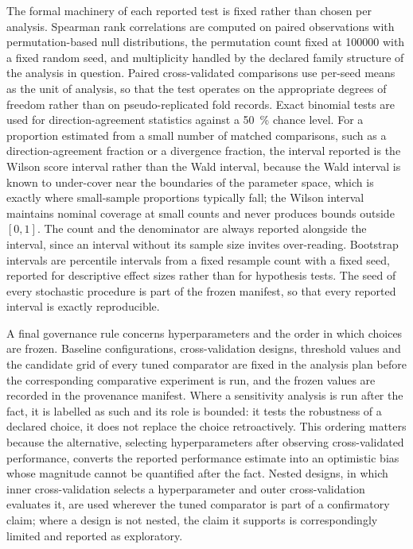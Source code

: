 The formal machinery of each reported test is fixed rather than chosen per analysis. Spearman rank correlations are computed on paired observations with permutation-based null distributions, the permutation count fixed at \num{100000} with a fixed random seed, and multiplicity handled by the declared family structure of the analysis in question. Paired cross-validated comparisons use per-seed means as the unit of analysis, so that the test operates on the appropriate degrees of freedom rather than on pseudo-replicated fold records. Exact binomial tests are used for direction-agreement statistics against a \qty{50}{\percent} chance level. For a proportion estimated from a small number of matched comparisons, such as a direction-agreement fraction or a divergence fraction, the interval reported is the Wilson score interval rather than the Wald interval, because the Wald interval is known to under-cover near the boundaries of the parameter space, which is exactly where small-sample proportions typically fall; the Wilson interval maintains nominal coverage at small counts and never produces bounds outside $[0, 1]$. The count and the denominator are always reported alongside the interval, since an interval without its sample size invites over-reading. Bootstrap intervals are percentile intervals from a fixed resample count with a fixed seed, reported for descriptive effect sizes rather than for hypothesis tests. The seed of every stochastic procedure is part of the frozen manifest, so that every reported interval is exactly reproducible.

A final governance rule concerns hyperparameters and the order in which choices are frozen. Baseline configurations, cross-validation designs, threshold values and the candidate grid of every tuned comparator are fixed in the analysis plan before the corresponding comparative experiment is run, and the frozen values are recorded in the provenance manifest. Where a sensitivity analysis is run after the fact, it is labelled as such and its role is bounded: it tests the robustness of a declared choice, it does not replace the choice retroactively. This ordering matters because the alternative, selecting hyperparameters after observing cross-validated performance, converts the reported performance estimate into an optimistic bias whose magnitude cannot be quantified after the fact. Nested designs, in which inner cross-validation selects a hyperparameter and outer cross-validation evaluates it, are used wherever the tuned comparator is part of a confirmatory claim; where a design is not nested, the claim it supports is correspondingly limited and reported as exploratory.


